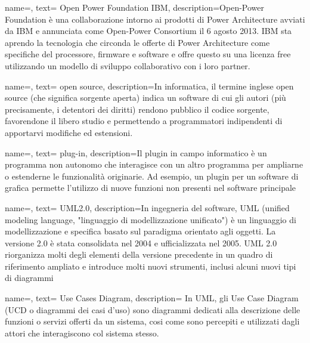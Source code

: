 {
    name=,
    text= Open Power Foundation IBM,
    description={Open-Power Foundation è una collaborazione intorno ai prodotti di Power Architecture avviati da IBM e annunciata come Open-Power Consortium il 6 agosto 2013. IBM sta aprendo la tecnologia che circonda le offerte di Power Architecture come specifiche del processore, firmware e software e offre questo su una licenza free utilizzando un modello di sviluppo collaborativo con i loro partner.}
}




{
    name=,
    text= open source,
    description={In informatica, il termine inglese open source (che significa sorgente aperta) indica un software di cui gli autori (più precisamente, i detentori dei diritti) rendono pubblico il codice sorgente, favorendone il libero studio e permettendo a programmatori indipendenti di apportarvi modifiche ed estensioni.}
}

{
    name=,
    text= plug-in,
    description={Il plugin in campo informatico è un programma non autonomo che interagisce con un altro programma per ampliarne o estenderne le funzionalità originarie. Ad esempio, un plugin per un software di grafica permette l'utilizzo di nuove funzioni non presenti nel software principale}
}


{
    name=,
    text= UML2.0,
    description={In ingegneria del software, UML (unified modeling language, "linguaggio di modellizzazione unificato") è un linguaggio di modellizzazione e specifica basato
sul paradigma orientato agli oggetti. La versione 2.0 è stata consolidata nel 2004 e ufficializzata nel 2005. UML 2.0 riorganizza molti degli elementi della versione precedente in un quadro di riferimento ampliato e introduce molti nuovi strumenti, inclusi alcuni nuovi tipi di diagrammi }
}



{
    name=,
    text= Use Cases Diagram,
    description={ In UML, gli Use Case Diagram (UCD o diagrammi dei casi d'uso) sono diagrammi dedicati alla descrizione delle funzioni o servizi offerti da un sistema, cosi come sono percepiti e utilizzati dagli attori che interagiscono col sistema stesso.}
}


